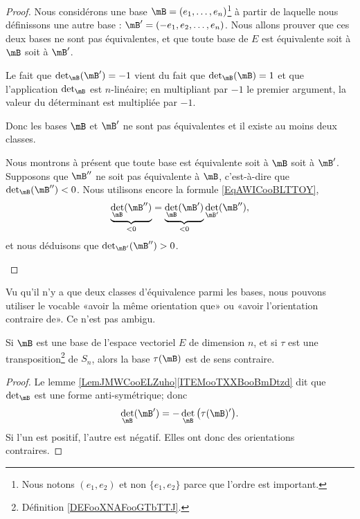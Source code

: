 \begin{proof}
    Nous considérons une base \( \mB=(e_1,\ldots, e_n)\)\footnote{Nous notons \( (e_1,e_2)\) et non \( \{ e_1,e_2 \}\) parce que l'ordre est important.} à partir de laquelle nous définissons une autre base : \( \mB'=( -e_1,e_2,\ldots, e_n )\). Nous allons prouver que ces deux bases ne sont pas équivalentes, et que toute base de \( E\) est équivalente soit à \( \mB\) soit à \( \mB'\).

	\begin{subproof}
		Le fait que \( \det_{\mB}(\mB')=-1\) vient du fait que \( \det_{\mB}(\mB)=1\) et que l'application \( \det_{\mB}\) est \( n\)-linéaire; en multipliant par \( -1\) le premier argument, la valeur du déterminant est multipliée par \( -1\).

		Donc les bases \( \mB\) et \( \mB'\) ne sont pas équivalentes et il existe au moins deux classes.

		Nous montrons à présent que toute base est équivalente soit à \( \mB\) soit à \( \mB'\). Supposons que \( \mB''\) ne soit pas équivalente à \( \mB\), c'est-à-dire que \( \det_{\mB}(\mB'')<0\). Nous utilisons encore la formule \eqref{EqAWICooBLTTOY},
		\begin{equation}
			\underbrace{\det_{\mB}(\mB'')}_{<0}=\underbrace{\det_{\mB}(\mB')}_{<0}\det_{\mB'}(\mB''),
		\end{equation}
		et nous déduisons que \( \det_{\mB'}(\mB'')>0\).
	\end{subproof}
\end{proof}

\begin{normaltext}
	Vu qu'il n'y a que deux classes d'équivalence parmi les bases, nous pouvons utiliser le vocable «avoir la même orientation que» ou «avoir l'orientation contraire de». Ce n'est pas ambigu.
\end{normaltext}

\begin{proposition}
	Si \( \mB\) est une base de l'espace vectoriel \( E\) de dimension \( n\), et si \( \tau\) est une transposition\footnote{Définition \ref{DEFooXNAFooGTbTTJ}.} de \( S_n\), alors la base \( \tau(\mB)\) est de sens contraire.
\end{proposition}

\begin{proof}
	Le lemme \ref{LemJMWCooELZuho}\ref{ITEMooTXXBooBmDtzd} dit que \( \det_{\mB}\) est une forme anti-symétrique; donc
	\begin{equation}
		\det_{\mB}(\mB')=-\det_{\mB}\big( \tau(\mB)' \big).
	\end{equation}
	Si l'un est positif, l'autre est négatif. Elles ont donc des orientations contraires.
\end{proof}

